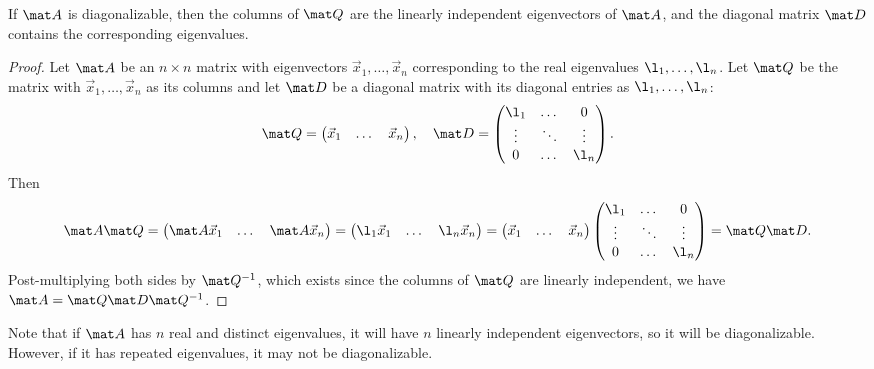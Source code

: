 \begin{proposition}
    If $\mat A$ is diagonalizable, then the columns of $\mat Q$ are the linearly independent eigenvectors of $\mat A$, and the diagonal matrix $\mat D$ contains the corresponding eigenvalues.
\end{proposition}
\begin{proof}
    Let $\mat A$ be an $n \times n$ matrix with eigenvectors $\vec x_1, \dots, \vec x_n$ corresponding to the real eigenvalues $\l_1, \dots, \l_n$. Let $\mat Q$ be the matrix with $\vec x_1, \dots, \vec x_n$ as its columns and let $\mat D$ be a diagonal matrix with its diagonal entries as $\l_1, \dots, \l_n$: \[\mat Q = \begin{pmatrix}\vec x_1 & \dots & \vec x_n\end{pmatrix}, \quad \mat D = \begin{pmatrix}\l_1 & \dots & 0 \\ \vdots & \ddots & \vdots \\ 0 & \dots & \l_n\end{pmatrix}.\] Then \[\mat A \mat Q = \begin{pmatrix}\mat A \vec x_1 & \dots & \mat A \vec x_n\end{pmatrix} = \begin{pmatrix}\l_1 \vec x_1 & \dots & \l_n \vec x_n\end{pmatrix} = \begin{pmatrix}\vec x_1 & \dots & \vec x_n\end{pmatrix} \begin{pmatrix}\l_1 & \dots & 0 \\ \vdots & \ddots & \vdots \\ 0 & \dots & \l_n\end{pmatrix} = \mat Q \mat D.\] Post-multiplying both sides by $\mat Q^{-1}$, which exists since the columns of $\mat Q$ are linearly independent, we have $\mat A = \mat Q \mat D \mat Q^{-1}$.
\end{proof}

Note that if $\mat A$ has $n$ real and distinct eigenvalues, it will have $n$ linearly independent eigenvectors, so it will be diagonalizable. However, if it has repeated eigenvalues, it may not be diagonalizable.

